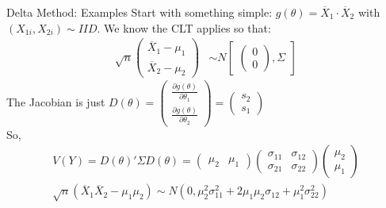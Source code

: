 \begin{frame}{Delta Method: Examples}
Start with something simple: $g(\theta)= \overline{X}_1\cdot \overline{X}_2$ with $(X_{1i},X_{2i}) \sim IID$.
We know the CLT applies so that:
\begin{eqnarray*}
\sqrt{n}
\begin{pmatrix}
\overline{X}_1 - \mu_1\\
\overline{X}_2 - \mu_2
\end{pmatrix} &\sim  N
\begin{bmatrix}
\begin{pmatrix}
0\\
0
\end{pmatrix},
\Sigma
\end{bmatrix}
\end{eqnarray*}
The Jacobian is just $D(\theta) =  \begin{pmatrix}\frac{\partial g(\theta)}{\partial \theta_1} \\ \frac{\partial g(\theta)}{\partial \theta_2}  \end{pmatrix} =  \begin{pmatrix}s_2\\ s_1 \end{pmatrix}$\\
So,
\begin{eqnarray*}
V(Y) = D(\theta)' \Sigma D(\theta) =\begin{pmatrix} \mu_2 & \mu_1 \end{pmatrix}  \begin{pmatrix} \sigma_{11} & \sigma_{12} \\ \sigma_{21} & \sigma_{22} \end{pmatrix} \begin{pmatrix} \mu_2 \\\mu_1  
\end{pmatrix} \\
\sqrt{n} ( \overline{X}_1 \overline{X}_2 - \mu_1 \mu_2) \sim N(0,\mu_2^2 \sigma_{11}^2 + 2 \mu_1 \mu_2 \sigma_{12}  + \mu_1^2 \sigma_{22}^2)
\end{eqnarray*}
\end{frame}

